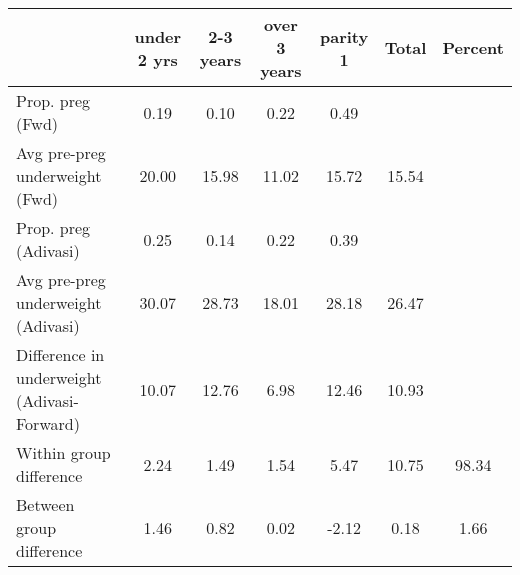 \begin{tabular}{l*{6}{c}}
\toprule
            &\multicolumn{1}{c}{under 2 yrs}&\multicolumn{1}{c}{2-3 years}&\multicolumn{1}{c}{over 3 years}&\multicolumn{1}{c}{parity 1}&\multicolumn{1}{c}{Total}&\multicolumn{1}{c}{Percent}\\
\midrule
\midrule
Prop. preg (Fwd)&        0.19&        0.10&        0.22&        0.49&            &            \\
Avg pre-preg underweight (Fwd)&       20.00&       15.98&       11.02&       15.72&       15.54&            \\
Prop. preg (Adivasi)&        0.25&        0.14&        0.22&        0.39&            &            \\
Avg pre-preg underweight (Adivasi)&       30.07&       28.73&       18.01&       28.18&       26.47&            \\
Difference in underweight (Adivasi-Forward)&       10.07&       12.76&        6.98&       12.46&       10.93&            \\
Within group difference&        2.24&        1.49&        1.54&        5.47&       10.75&       98.34\\
Between group difference&        1.46&        0.82&        0.02&       -2.12&        0.18&        1.66\\
\bottomrule
\end{tabular}
